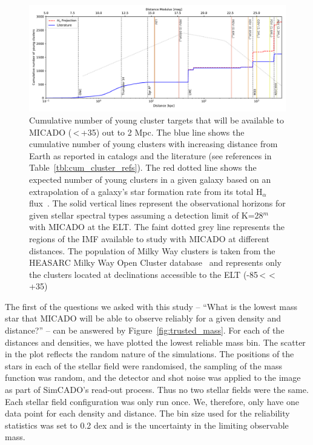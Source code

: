 \documentclass[referee]{aa}
\begin{document}
\begin{figure}

    \centering
    \includegraphics[width=\textwidth]{young_clusters_within_2Mpc_incl_MW.pdf}

    \caption{Cumulative number of young cluster targets that will be available to MICADO (\textdelta\,\textless\,+35\textdegree) out to 2 Mpc.
    The blue line shows the cumulative number of young clusters with increasing distance from Earth as reported in catalogs and the literature (see references in Table~\ref{tbl:cum_cluster_refs}).
    The red dotted line shows the expected number of young clusters in a given galaxy based on an extrapolation of a galaxy's star formation rate from its total H$_\alpha$ flux~\citep{caldwell09}.
    The solid vertical lines represent the observational horizons for given stellar spectral types assuming a detection limit of K=28$^m$ with MICADO at the ELT.
    The faint dotted grey line represents the regions of the IMF available to study with MICADO at different distances.
    The population of Milky Way clusters is taken from the HEASARC Milky Way Open Cluster database~\citep{heasarc_mwsc} and represents only the clusters located at declinations accessible to the ELT (-85\textdegree\,\textless\,\textdelta\,\textless\,+35\textdegree)
    }
    \label{fig:local_group_cluster_number}

\end{figure}


The first of the questions we asked with this study -- ``What is the lowest mass star that MICADO will be able to observe reliably for a given density and distance?'' -- can be answered by Figure~\ref{fig:trusted_mass}.
For each of the distances and densities, we have plotted the lowest reliable mass bin.
The scatter in the plot reflects the random nature of the simulations.
The positions of the stars in each of the stellar field were randomised, the sampling of the mass function was random, and the detector and shot noise was applied to the image as part of SimCADO's read-out process.
Thus no two stellar fields were the same.
Each stellar field configuration was only run once.
We, therefore, only have one data point for each density and distance.
The bin size used for the reliability statistics was set to 0.2 dex and is the uncertainty in the limiting observable mass.
\end{document}
